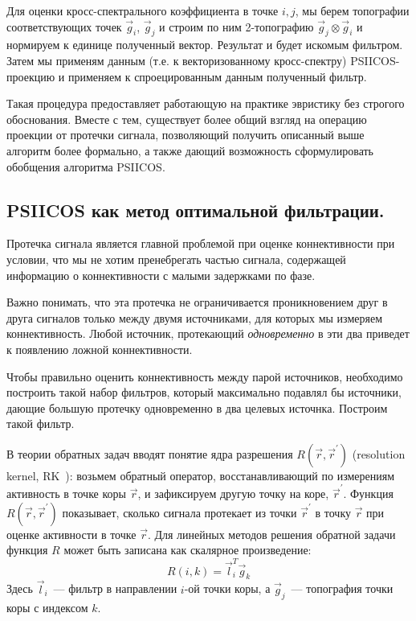 Для оценки кросс-спектрального коэффициента в точке
$i, j$, мы берем топографии соответствующих точек $\vec{g}_i$, $\vec{g}_j$ и
строим по ним 2-топографию $\vec{g}_j \otimes \vec{g}_i$ и нормируем к единице полученный вектор.
Результат и будет искомым фильтром.
Затем мы применям данным (т.е. к векторизованному кросс-спектру) PSIICOS-проекцию
и применяем к спроецированным данным полученный фильтр.

Такая процедура предоставляет работающую на практике эвристику без строгого обоснования.
Вместе с тем, существует более общий взгляд на операцию проекции от протечки сигнала,
позволяющий получить описанный выше алгоритм более формально, а также дающий возможность
сформулировать обобщения алгоритма PSIICOS.\@

\subsection{PSIICOS как метод оптимальной фильтрации.}

Протечка сигнала является главной проблемой при оценке коннективности при
условии, что мы не хотим пренебрегать частью сигнала, содержащей информацию
о коннективности с малыми задержками по фазе.

Важно понимать, что эта протечка не ограничивается проникновением друг в друга
сигналов только между двумя источниками, для которых мы измеряем
коннективность. Любой источник, протекающий \emph{одновременно} в эти два приведет
к появлению ложной коннективности.

Чтобы правильно оценить коннективность между парой источников,
необходимо построить такой набор фильтров, который максимально
подавлял бы источники, дающие большую протечку одновременно в два
целевых источнка. Построим такой фильтр.

В теории обратных задач вводят понятие ядра разрешения $R(\vec{r},
\vec{r}^{\prime})$ (resolution kernel, RK~\cite{Sekihara2007}): возьмем
обратный оператор, восстанавливающий по измерениям активность в точке коры
$\vec{r}$, и зафиксируем другую точку на коре, $\vec{r}^{\prime}$.  Функция
$R(\vec{r}, \vec{r}^{\prime})$ показывает, сколько сигнала протекает из точки
$\vec{r}^{\prime}$ в точку $\vec{r}$ при оценке активности в точке $\vec{r}$.
Для линейных методов решения обратной задачи функция $R$ может быть записана как
скалярное произведение:
\begin{equation}
    R(i, k) = \vec{l}_i^T \vec{g}_k
    \label{eq:resolution_kernel}
\end{equation}
Здесь $\vec{l}_i$~--- фильтр в направлении $i$-ой точки коры, а
$\vec{g}_j$~--- топография точки коры с индексом $k$.


